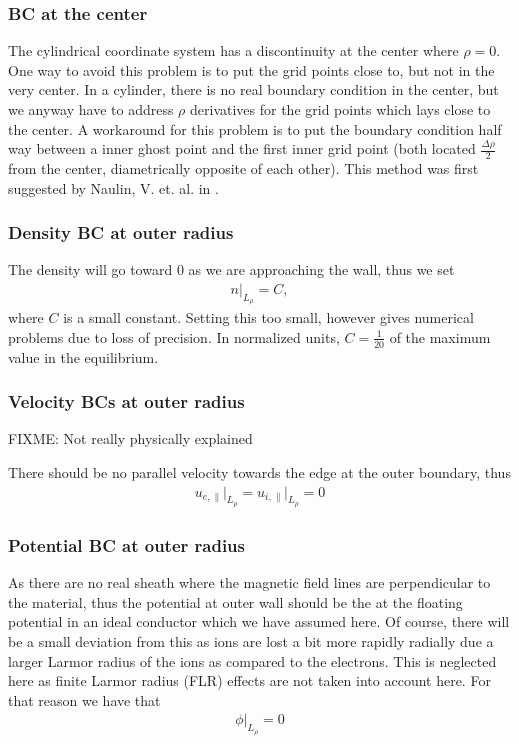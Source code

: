 \subsubsection{BC at the center}
%
The cylindrical coordinate system has a discontinuity at the center where
$\rho=0$. One way to avoid this problem is to put the grid points close to, but
not in the very center. In a cylinder, there is no real boundary condition in
the center, but we anyway have to address $\rho$ derivatives for the grid
points which lays close to the center. A workaround for this problem is to put
the boundary condition half way between a inner ghost point and the first inner
grid point (both located $\frac{\Delta \rho}{2}$ from the center, diametrically
opposite of each other). This method was first suggested by Naulin, V. et. al.
in \cite{Naulin2008}.


\subsubsection{Density BC at outer radius}
The density will go toward $0$ as we are approaching the wall, thus we set
%
\begin{align*}
    n \bigg|_{L_\rho} = C,
\end{align*}
%
where $C$ is a small constant. Setting this too small, however gives numerical
problems due to loss of precision. In normalized units, $C = \frac{1}{20}$ of
the maximum value in the equilibrium.

\subsubsection{Velocity BCs at outer radius}
FIXME: Not really physically explained

There should be no parallel velocity towards the edge at the outer boundary,
thus
%
\begin{align*}
    u_{e,\|} \bigg|_{L_\rho} = u_{i,\|} \bigg|_{L_\rho} = 0
\end{align*}

\subsubsection{Potential BC at outer radius}
%
As there are no real sheath where the magnetic field lines are perpendicular to
the material, thus the potential at outer wall should be the at the floating
potential in an ideal conductor which we have assumed here. Of course, there
will be a small deviation from this as ions are lost a bit more rapidly
radially due a larger Larmor radius of the ions as compared to the electrons.
This is neglected here as finite Larmor radius (FLR) effects are not taken
into account here. For that reason we have that
%
\begin{align*}
    \phi \bigg|_{L_\rho} = 0
\end{align*}


